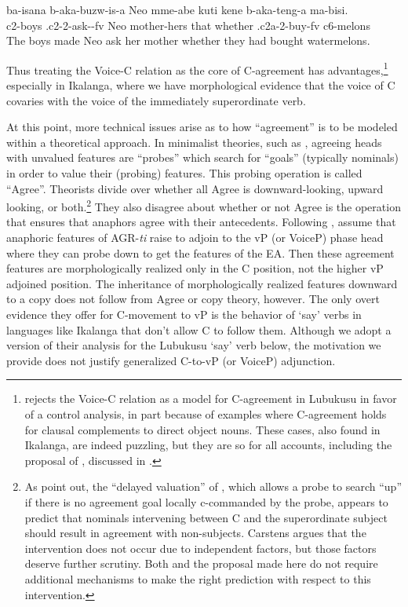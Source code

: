 \documentclass[output=paper,
modfonts
]{langscibook}
\begin{document}
\ea\label{n30} \gll ba-isana	b-aka-buzw-is-a			Neo	mme-abe	kuti	kene b-aka-teng-a		ma-bisi.\\
       c2-boys	.c2-2-ask--fv	Neo	mother-hers	that whether .c2a-2-buy-fv	c6-melons\\
    \glt The boys made Neo ask her mother whether they had bought watermelons. \z 

Thus treating the Voice-C relation as the core of C-agreement has advantages,\footnote{\citet[367--369]{Diercks2010} rejects the Voice-C relation as a model for C-agreement in Lubukusu in favor of a control analysis, in part because of examples where C-agreement holds for clausal complements to direct object nouns. These cases, also found in Ikalanga, are indeed puzzling, but they are so for all accounts, including the proposal of \citet{Diercks2017a}, discussed in .}  especially in Ikalanga, where we have morphological evidence that the voice of C covaries with the voice of the immediately superordinate verb.

At this point, more technical issues arise as to how ``agreement'' is to be modeled within a theoretical approach. In minimalist theories, such as \citet{Chomsky2001}, 
agreeing heads with unvalued features are ``probes'' which search for ``goals'' (typically nominals) in order to value their (probing) features. This probing operation is called ``Agree''. Theorists divide over whether all Agree is downward-looking, upward looking, or both.\footnote{As \cite{Diercks2017a} point out, the ``delayed valuation'' of \citet{Carstens2016}, which allows a probe to search ``up'' if there is no agreement goal locally c-commanded by the probe, appears to predict that nominals intervening between C and the superordinate subject should result in agreement with non-subjects. Carstens argues that the intervention does not occur due to independent factors, but those factors deserve further scrutiny. Both \citeauthor{Diercks2017a} and the proposal made here do not require additional mechanisms to make the right prediction with respect to this intervention.} They also disagree about whether or not Agree is the operation that ensures that anaphors agree with their antecedents. Following \citet{Rooryck2011}, \citet{Diercks2017a} assume that anaphoric features of AGR-\textit{ti} raise to adjoin to the vP (or VoiceP) phase head where they can probe down to get the features of the EA. Then these agreement features are morphologically realized only in the C position, not the higher vP adjoined position. The inheritance of morphologically realized features downward to a copy does not follow from Agree or copy theory, however. The only overt evidence they offer for C-movement to vP is the behavior of `say' verbs in languages like Ikalanga that don’t allow C to follow them. Although we adopt a version of their analysis for the Lubukusu `say' verb below, the motivation we provide does not justify generalized C-to-vP (or VoiceP) adjunction.
\end{document}
